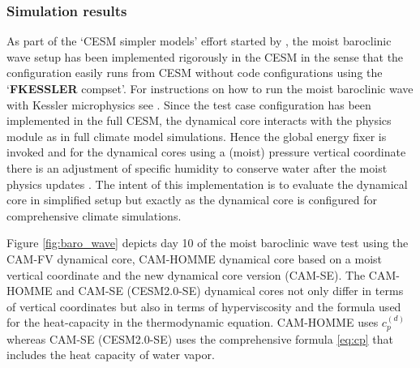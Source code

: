 \documentclass{agujournal}
\begin{document}
{%

\subsubsection{Simulation results}
As part of the `CESM simpler models' effort started by \citet{CESM_SIMPLER_MODELS}, the moist baroclinic wave setup has been implemented rigorously in the CESM in the sense that the configuration easily runs from CESM without code configurations using the `{\bf FKESSLER} compset'. For instructions on how to run the moist baroclinic wave with Kessler microphysics see \citet{FKESSLER}. Since the test case configuration has been implemented in the full CESM, the dynamical core interacts with the physics module as in full climate model simulations. Hence the global energy fixer is invoked \citep{WOHTTV2015JAMES} and for the dynamical cores using a (moist) pressure vertical coordinate there is an adjustment of specific humidity to conserve water after the moist physics updates \citep[see Section 3.1.6 in ][]{CAM5}. The intent of this implementation is to evaluate the dynamical core in simplified setup but exactly as the dynamical core is configured for comprehensive climate simulations.

Figure \ref{fig:baro_wave} depicts day 10 of the moist baroclinic wave test using the CAM-FV \citep[Finite-Volume; ][]{L2004MWR} dynamical core, CAM-HOMME dynamical core based on a moist vertical coordinate and the new dynamical core version (CAM-SE). The CAM-HOMME and CAM-SE (CESM2.0-SE) dynamical cores not only differ in terms of vertical coordinates but also in terms of hyperviscosity and the formula used for the heat-capacity in the thermodynamic equation. CAM-HOMME uses $c_p^{(d)}$ whereas CAM-SE (CESM2.0-SE) uses the comprehensive formula \eqref{eq:cp} that includes the heat capacity of water vapor.

}
\end{document}
